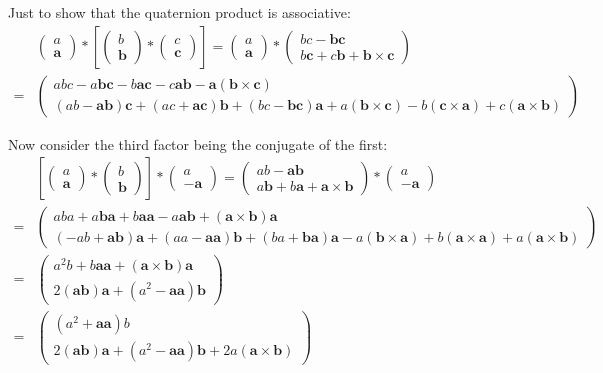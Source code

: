 \documentclass[11pt]{article}
\newcommand{\vvv}[1]{\ensuremath{\begin{pmatrix}#1\end{pmatrix}}}
\begin{document}
Just to show that the quaternion product is associative:
\begin{equation}
    \begin{aligned}
        &\vvv{a \\ \mathbf{a}} * [\vvv{b \\ \mathbf{b}} * \vvv{c \\ \mathbf{c}}]
        = \vvv{a \\ \mathbf{a}} *
        \vvv{bc - \mathbf{b} \mathbf{c} \\ b\mathbf{c} + c\mathbf{b} + \mathbf{b} \times \mathbf{c}} \\
        = &\vvv{
            abc - a\mathbf{b}\mathbf{c} - b\mathbf{a}\mathbf{c} - 
            c\mathbf{a}\mathbf{b} - \mathbf{a}(\mathbf{b} \times \mathbf{c}) \\
            (ab - \mathbf{a}\mathbf{b})\mathbf{c} +
            (ac + \mathbf{a}\mathbf{c})\mathbf{b} +
            (bc - \mathbf{b}\mathbf{c})\mathbf{a} +
            a(\mathbf{b} \times \mathbf{c}) -
            b(\mathbf{c} \times \mathbf{a}) +
            c(\mathbf{a} \times \mathbf{b})
        }
    \end{aligned}
\end{equation}

Now consider the third factor being the conjugate of the first:
\begin{equation}
    \begin{aligned}
        &[\vvv{a \\ \mathbf{a}} * \vvv{b \\ \mathbf{b}}] * \vvv{a \\ -\mathbf{a}} = 
        \vvv{ab - \mathbf{a} \mathbf{b} \\ a\mathbf{b} + b\mathbf{a} + \mathbf{a} \times \mathbf{b}} *  
        \vvv{a \\ -\mathbf{a}} \\ =
        &\vvv{
            aba + a\mathbf{b}\mathbf{a} + b\mathbf{a}\mathbf{a} - 
            a\mathbf{a}\mathbf{b} + (\mathbf{a} \times \mathbf{b})\mathbf{a} \\
            (-ab + \mathbf{a}\mathbf{b})\mathbf{a} +
            (aa - \mathbf{a}\mathbf{a})\mathbf{b} +
            (ba + \mathbf{b}\mathbf{a})\mathbf{a} -
            a(\mathbf{b} \times \mathbf{a}) +
            b(\mathbf{a} \times \mathbf{a}) +
            a(\mathbf{a} \times \mathbf{b})
        } \\ =
        &\vvv{
            a^2b + b\mathbf{a}\mathbf{a} + (\mathbf{a} \times \mathbf{b})\mathbf{a} \\
            2(\mathbf{a}\mathbf{b})\mathbf{a} + (a^2 - \mathbf{a}\mathbf{a})\mathbf{b}
        } \\ =
        & \vvv{
            (a^2 + \mathbf{a}\mathbf{a})b \\
            2(\mathbf{a}\mathbf{b})\mathbf{a} 
            + (a^2 - \mathbf{a}\mathbf{a})\mathbf{b}
            + 2a(\mathbf{a} \times \mathbf{b})
        }
    \end{aligned}
\end{equation}
\end{document}

